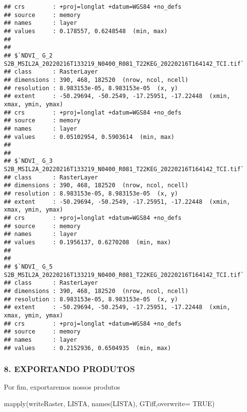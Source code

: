 \documentclass[
]{article}
\newenvironment{Shaded}{\begin{snugshade}}{\end{snugshade}}
\newcommand{\AttributeTok}[1]{\textcolor[rgb]{0.77,0.63,0.00}{#1}}
\newcommand{\ConstantTok}[1]{\textcolor[rgb]{0.00,0.00,0.00}{#1}}
\newcommand{\FunctionTok}[1]{\textcolor[rgb]{0.00,0.00,0.00}{#1}}
\newcommand{\NormalTok}[1]{#1}
\newcommand{\StringTok}[1]{\textcolor[rgb]{0.31,0.60,0.02}{#1}}
\begin{document}
\begin{verbatim}
## crs        : +proj=longlat +datum=WGS84 +no_defs 
## source     : memory
## names      : layer 
## values     : 0.178557, 0.6248548  (min, max)
## 
## 
## $`NDVI_ G_2 S2B_MSIL2A_20220216T133219_N0400_R081_T22KEG_20220216T164142_TCI.tif`
## class      : RasterLayer 
## dimensions : 390, 468, 182520  (nrow, ncol, ncell)
## resolution : 8.983153e-05, 8.983153e-05  (x, y)
## extent     : -50.29694, -50.2549, -17.25951, -17.22448  (xmin, xmax, ymin, ymax)
## crs        : +proj=longlat +datum=WGS84 +no_defs 
## source     : memory
## names      : layer 
## values     : 0.05102954, 0.5903614  (min, max)
## 
## 
## $`NDVI_ G_3 S2B_MSIL2A_20220216T133219_N0400_R081_T22KEG_20220216T164142_TCI.tif`
## class      : RasterLayer 
## dimensions : 390, 468, 182520  (nrow, ncol, ncell)
## resolution : 8.983153e-05, 8.983153e-05  (x, y)
## extent     : -50.29694, -50.2549, -17.25951, -17.22448  (xmin, xmax, ymin, ymax)
## crs        : +proj=longlat +datum=WGS84 +no_defs 
## source     : memory
## names      : layer 
## values     : 0.1956137, 0.6270208  (min, max)
## 
## 
## $`NDVI_ G_5 S2B_MSIL2A_20220216T133219_N0400_R081_T22KEG_20220216T164142_TCI.tif`
## class      : RasterLayer 
## dimensions : 390, 468, 182520  (nrow, ncol, ncell)
## resolution : 8.983153e-05, 8.983153e-05  (x, y)
## extent     : -50.29694, -50.2549, -17.25951, -17.22448  (xmin, xmax, ymin, ymax)
## crs        : +proj=longlat +datum=WGS84 +no_defs 
## source     : memory
## names      : layer 
## values     : 0.2152936, 0.6504935  (min, max)
\end{verbatim}

\hypertarget{exportando-produtos}{%
\subsubsection{8. EXPORTANDO PRODUTOS}\label{exportando-produtos}}

Por fim, exportaremos nossos produtos

\begin{Shaded}
\begin{Highlighting}[]
\FunctionTok{mapply}\NormalTok{(writeRaster, LISTA, }\FunctionTok{names}\NormalTok{(LISTA), }\StringTok{\textquotesingle{}GTiff\textquotesingle{}}\NormalTok{,}\AttributeTok{overwrite=} \ConstantTok{TRUE}\NormalTok{)}
\end{Highlighting}
\end{Shaded}
\end{document}
